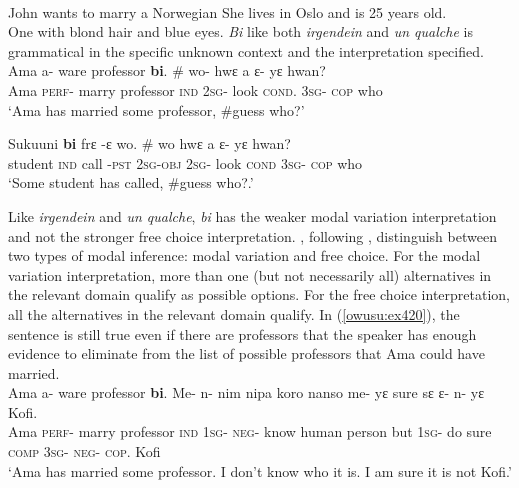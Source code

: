 \documentclass[output=paper,modfonts,nonflat,draftmode]{langsci/langscibook}
\begin{document}
\ea\label{owusu:ex40}\\
 John wants to marry a Norwegian
 \ea
 She lives in Oslo and is 25 years old.\\
\ex One with blond hair and blue eyes.
\z\z
\emph{Bi} like both \emph{irgendein} and \emph{un qualche} is grammatical in the specific unknown context  and the interpretation specified. 
\ea {}\\
\ea\label{owusu:ex42}
 \gll  Ama a- ware professor \textbf{bi}. \# wo- hwε a ε- yε hwan?\\
Ama \textsc{perf}- marry professor \textsc{ind} {} \textsc{2sg}- look  \textsc{cond}. \textsc{3sg}- \textsc{cop} who \\
    
\glt `Ama has married some professor, \#guess who?' 

\ex 
\gll  Sukuuni \textbf{bi} frε -ε wo. \# wo hwε a ε- yε hwan?\\
student  \textsc{ind} call -\textsc{pst}       \textsc{2sg}-\textsc{obj} {} \textsc{2sg}- look  \textsc{cond} \textsc{3sg}- \textsc{cop} who\\
    
\glt `Some student has called, \#guess who?.' 
\z \z

Like \emph{irgendein} and \emph{un qualche}, \emph{bi} has the weaker modal variation interpretation and not the stronger free choice interpretation. \citet{AloniPort2015}, following \citet{Benito2010}, distinguish between two types of modal inference: modal variation and free choice. 
For the modal variation interpretation, more than one (but not necessarily all) alternatives in the relevant domain qualify as possible options. For the free choice interpretation, all the alternatives in the relevant domain qualify. In (\ref{owusu:ex420}), the sentence is still true even if there are professors that the speaker has enough evidence to eliminate from the list of possible professors that Ama could have married.
\ea\label{owusu:ex420}\\
 \gll  Ama a- ware professor \textbf{bi}. Me- n- nim nipa koro nanso me- yε sure sε ε- n- yε Kofi.\\
Ama \textsc{perf}- marry professor \textsc{ind} \textsc{1sg}- \textsc{neg}- know human person but \textsc{1sg}- do sure \textsc{comp}  \textsc{3sg}- \textsc{neg}- \textsc{cop}. Kofi \\
    
\glt `Ama has married some professor. I don't know who it is. I am sure it is not Kofi.' 
\z 
\end{document}
